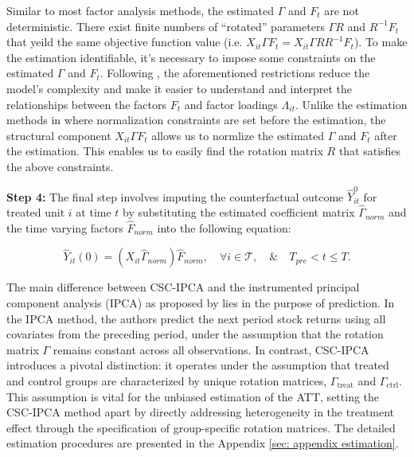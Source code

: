 \documentclass[12pt]{article}
\begin{document}
Similar to most factor analysis methods, the estimated $\Gamma$ and $F_t$ are not deterministic. There exist finite numbers of ``rotated'' parameters $\Gamma R$ and $R^{-1}F_t$ that yeild the same objective function value (i.e. $X_{it}\Gamma F_t = X_{it} \Gamma R R^{-1} F_t$). To make the estimation identifiable, it's necessary to impose some constraints on the estimated $\Gamma$ and $F_t$. Following \cite{connor1993test, stock2002forecasting, bai2002determining}, the aforementioned restrictions reduce the model's complexity and make it easier to understand and interpret the relationships between the factors $F_t$ and factor loadings $\Lambda_{it}$. Unlike the estimation methods in \cite{bai2009panel,xu2017generalized} where normalization constraints are set before the estimation, the structural component $X_{it}\Gamma F_t$ allows us to normlize the estimated $\Gamma$ and $F_t$ after the estimation. This enables us to easily find the rotation matrix $R$ that satisfies the above constraints.


\textbf{Step 4:} The final step involves imputing the counterfactual outcome $\hat{Y}_{it}^0$ for treated unit $i$ at time $t$ by substituting the estimated coefficient matrix $\hat{\Gamma}_{norm}$ and the time varying factors $\hat{F}_{norm}$ into the following equation:

\begin{equation}
\hat{Y}_{it}(0) = (X_{it} \hat{\Gamma}_{norm}) \hat{F}_{norm}, \quad \forall i \in \mathcal{T}, \quad \& \quad T_{pre} < t \leq T.
\end{equation}

The main difference between CSC-IPCA and the instrumented principal component analysis (IPCA) as proposed by \cite{kelly2020instrumented} lies in the purpose of prediction. In the IPCA method, the authors predict the next period stock returns using all covariates from the preceding period, under the assumption that the rotation matrix $\Gamma$ remains constant across all observations. In contrast, CSC-IPCA introduces a pivotal distinction: it operates under the assumption that treated and control groups are characterized by unique rotation matrices, $\Gamma_{\text{treat}}$ and $\Gamma_{\text{ctrl}}$. This assumption is vital for the unbiased estimation of the ATT, setting the CSC-IPCA method apart by directly addressing heterogeneity in the treatment effect through the specification of group-specific rotation matrices. The detailed estimation procedures are presented in the Appendix \ref{sec: appendix estimation}.
\end{document}
